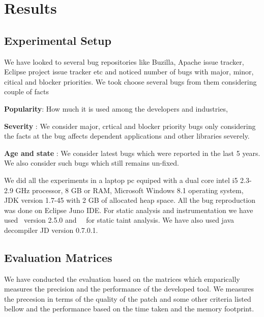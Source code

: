 
\section{Results}
\label{sec:results}


\subsection{Experimental Setup}
\label{sub:experimentalSetup}

We have looked to several bug repositories like Buzilla, Apache issue tracker,
Eclipse project issue tracker etc and noticed number of bugs with major,
minor, citical and blocker priorities. We took choose several bugs from them
considering couple of facts
\begin{mylist}

\item \textbf{Popularity}: How much it is used among the developers and
industries,
\item \textbf{Severity} : We consider major, crtical and blocker priority bugs
only considering the facts at the bug affects dependent applications and other
libraries severely.
\item \textbf{Age and state} : We consider latest bugs which were reported in
the last 5 years.
We also consider such bugs which still remains un-fixed.

We did all the experiments in a laptop pc equiped with a dual core intel i5
2.3-2.9 GHz processor, 8 GB or RAM, Microsoft Windows 8.1 operating system, JDK
version 1.7-45 with 2 GB of allocated heap space. All the bug reproduction was done on
Eclipse Juno IDE. For static analysis and instrumentation we have used \soot\
version 2.5.0 and \soot\ \infoflow\ for static taint analysis. We have also used
java decompiler JD version 0.7.0.1. 

\end{mylist}


\subsection{Evaluation Matrices}
\label{sub:evaluationMartices}

We have conducted the evaluation based on the matrices which emparically
measures the precision and the performance of the developed tool. We measures
the precesion in terms of the quality of the patch and some other criteria
listed bellow and the performance based on the time taken and the memory
footprint.

